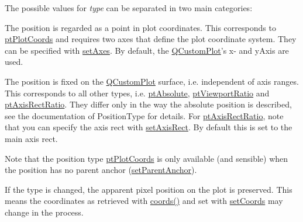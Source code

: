 The possible values for {\itshape type} can be separated in two main categories\-:

\begin{DoxyItemize}
\item The position is regarded as a point in plot coordinates. This corresponds to \hyperlink{class_q_c_p_item_position_aad9936c22bf43e3d358552f6e86dbdc8ad5ffb8dc99ad73263f7010c77342294c}{pt\-Plot\-Coords} and requires two axes that define the plot coordinate system. They can be specified with \hyperlink{class_q_c_p_item_position_a2185f45c75ac8cb9be89daeaaad50e37}{set\-Axes}. By default, the \hyperlink{class_q_custom_plot}{Q\-Custom\-Plot}'s x-\/ and y\-Axis are used.\end{DoxyItemize}
\begin{DoxyItemize}
\item The position is fixed on the \hyperlink{class_q_custom_plot}{Q\-Custom\-Plot} surface, i.\-e. independent of axis ranges. This corresponds to all other types, i.\-e. \hyperlink{class_q_c_p_item_position_aad9936c22bf43e3d358552f6e86dbdc8a564f5e53e550ead1ec5fc7fc7d0b73e0}{pt\-Absolute}, \hyperlink{class_q_c_p_item_position_aad9936c22bf43e3d358552f6e86dbdc8ac7d6aa89ceacb39658b0d6da061c789a}{pt\-Viewport\-Ratio} and \hyperlink{class_q_c_p_item_position_aad9936c22bf43e3d358552f6e86dbdc8a01080fd00eaf09fa238ef6b73bbfef75}{pt\-Axis\-Rect\-Ratio}. They differ only in the way the absolute position is described, see the documentation of Position\-Type for details. For \hyperlink{class_q_c_p_item_position_aad9936c22bf43e3d358552f6e86dbdc8a01080fd00eaf09fa238ef6b73bbfef75}{pt\-Axis\-Rect\-Ratio}, note that you can specify the axis rect with \hyperlink{class_q_c_p_item_position_a0cd9b326fb324710169e92e8ca0041c2}{set\-Axis\-Rect}. By default this is set to the main axis rect.\end{DoxyItemize}
Note that the position type \hyperlink{class_q_c_p_item_position_aad9936c22bf43e3d358552f6e86dbdc8ad5ffb8dc99ad73263f7010c77342294c}{pt\-Plot\-Coords} is only available (and sensible) when the position has no parent anchor (\hyperlink{class_q_c_p_item_position_ac094d67a95d2dceafa0d50b9db3a7e51}{set\-Parent\-Anchor}).

If the type is changed, the apparent pixel position on the plot is preserved. This means the coordinates as retrieved with \hyperlink{class_q_c_p_item_position_a253d7adbb6d46299bd6cbc31aa8819f1}{coords()} and set with \hyperlink{class_q_c_p_item_position_aa988ba4e87ab684c9021017dcaba945f}{set\-Coords} may change in the process. 

